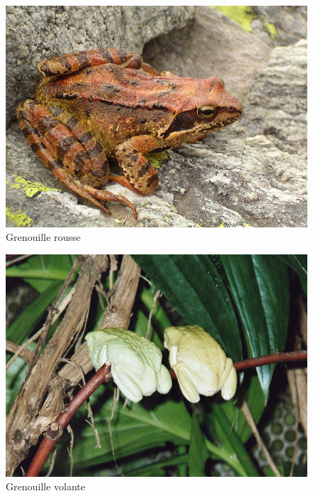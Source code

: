 \documentclass[10pt,a4paper]{article}
\begin{document}
\begin{figure}
 \begin{center}
 \includegraphics[scale=0.3]{Grenouille_rousse.jpg}
 \caption{Grenouille rousse}
 \end{center}
\end{figure}
 
\begin{figure}
 \begin{center}
  \includegraphics[scale=0.3]{grenouille_volante.jpg}
  \caption{Grenouille volante}
 \end{center}
\end{figure}

    
    
\end{document}
